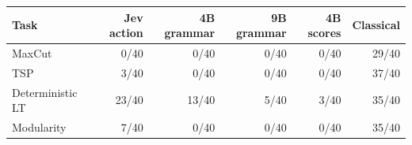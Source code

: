 \begin{tabular}{lrrrrr}
\toprule
Task & Jev action & 4B grammar & 9B grammar & 4B scores & Classical \\
\midrule
MaxCut & 0/40 & 0/40 & 0/40 & 0/40 & 29/40 \\
TSP & 3/40 & 0/40 & 0/40 & 0/40 & 37/40 \\
Deterministic LT & 23/40 & 13/40 & 5/40 & 3/40 & 35/40 \\
Modularity & 7/40 & 0/40 & 0/40 & 0/40 & 35/40 \\
\bottomrule
\end{tabular}
